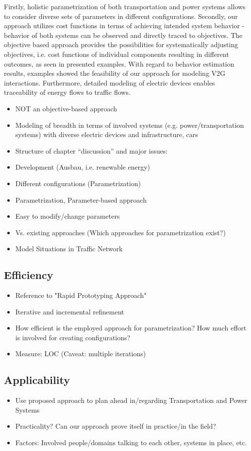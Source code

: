 Firstly, holistic parametrization of both transportation and power systems allows to consider diverse sets of parameters in different configurations. Secondly, our approach utilizes cost functions in terms of achieving intended system behavior - behavior of both systems can be observed and directly traced to objectives. The objective based approach provides the possibilities for systematically adjusting objectives, i.e. cost functions of individual components resulting in different outcomes, as seen in presented examples. With regard to behavior estimation results, examples showed the feasibility of our approach for modeling V2G interactions. Furthermore, detailed modeling of electric devices enables traceability of energy flows to traffic flows.

\begin{itemize}
	\item NOT an objective-based approach
	\item Modeling of breadth in terms of involved systems (e.g. power/transportation systems) with diverse electric devices and infrastructure, cars
	\item Structure of chapter “discussion” and major issues:
	\item Development (Ausbau, i.e. renewable energy)
	\item Different configurations (Parametrization)
	\item Parametrization, Parameter-based approach
	\item Easy to modify/change parameters
	\item Vs. existing approaches (Which approaches for parametrization exist?)
	\item Model Situations in Traffic Network
\end{itemize}

\subsection{Efficiency}

\begin{itemize}
	\item Reference to "Rapid Prototyping Approach"
	\item Iterative and incremental refinement
	\item How efficient is the employed approach for parametrization? How much effort is involved for creating configurations?
	\item Measure: LOC (Caveat: multiple iterations)
\end{itemize}

\subsection{Applicability}

\begin{itemize}
	\item Use proposed approach to plan ahead in/regarding Transportation and Power Systems
	\item Practicality? Can our approach prove itself in practice/in the field?
	\item Factors: Involved people/domains talking to each other, systems in place, etc.
\end{itemize}